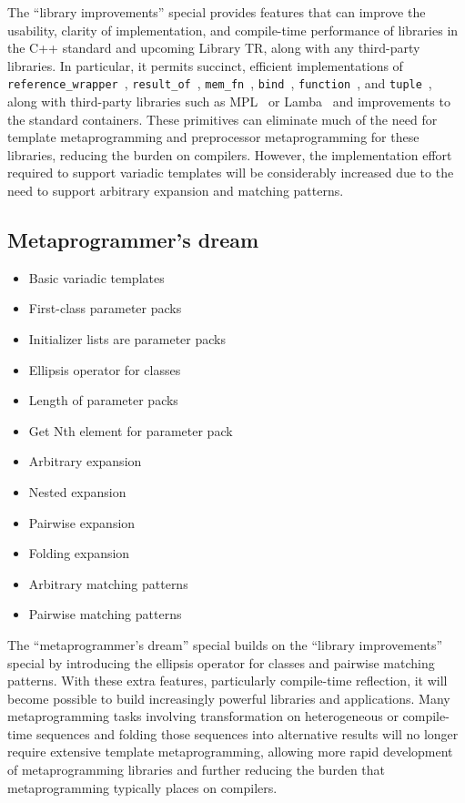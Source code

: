 \documentclass{article}
\begin{document}
The ``library improvements'' special provides features that can
improve the usability, clarity of implementation, and compile-time
performance of libraries in the C++ standard and upcoming Library TR,
along with any third-party libraries. In particular, it permits
succinct, efficient implementations of
\texttt{reference\_wrapper}~\cite[\S 2.1]{Austern04b},
\texttt{result\_of}~\cite[\S 3.1]{Austern04b},
\texttt{mem\_fn}~\cite[\S 3.1]{Austern04b}, \texttt{bind}~\cite[\S
  3.3]{Austern04b}, \texttt{function}~\cite[\S 3.4]{Austern04b}, and
\texttt{tuple}~\cite[\S 6.1]{Austern04b}, along with third-party
libraries such as MPL~\cite{Gurtovoy02} or Lamba~\cite{Lambda02} and
improvements to the standard containers. These primitives can
eliminate much of the need for template metaprogramming and
preprocessor metaprogramming for these libraries, reducing the burden
on compilers. However, the implementation effort required to support
variadic templates will be considerably increased due to the need to
support arbitrary expansion and matching patterns.

\subsection{Metaprogrammer's dream}
\begin{itemize}
\item Basic variadic templates
\item First-class parameter packs
\item Initializer lists are parameter packs
\item Ellipsis operator for classes
\item Length of parameter packs
\item Get Nth element for parameter pack
\item Arbitrary expansion
\item Nested expansion
\item Pairwise expansion
\item Folding expansion
\item Arbitrary matching patterns
\item Pairwise matching patterns
\end{itemize}

The ``metaprogrammer's dream'' special builds on the ``library
improvements'' special by introducing the ellipsis operator for
classes and pairwise matching patterns. With these extra features,
particularly compile-time reflection, it will become possible to build
increasingly powerful libraries and applications. Many metaprogramming
tasks involving transformation on heterogeneous or compile-time
sequences and folding those sequences into alternative results will
no longer require extensive template metaprogramming, allowing more
rapid development of metaprogramming libraries and further reducing
the burden that metaprogramming typically places on compilers.
\end{document}
